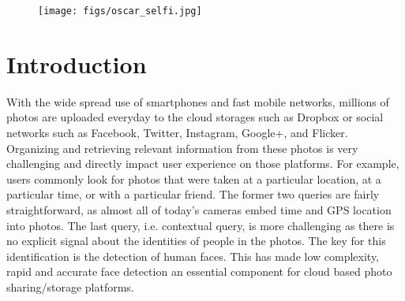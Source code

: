 \documentclass{sig-alternate-2013}
\begin{document}



\begin{figure}[t] 
  \centering
    \texttt{[image: figs/oscar\_selfi.jpg]}
  \caption{}
  \label{fig:challenging_faces}
\end{figure}

\section{Introduction}

With the wide spread use of smartphones and fast mobile networks, millions of photos are uploaded everyday to the cloud storages such as Dropbox or social networks such as Facebook, Twitter, Instagram, Google+, and Flicker. Organizing and retrieving relevant information from these photos is very challenging and directly impact user experience on those platforms. For example, users commonly look for photos that were taken at a particular location, at a particular time, or with a particular friend. The former two queries are fairly straightforward, as almost all of today's cameras embed time and GPS location into photos. The last query, i.e. contextual query, is more challenging as there is no explicit signal about the identities of people in the photos. The key for this identification is the detection of human faces. This has made low complexity, rapid and accurate face detection an essential component for cloud based photo sharing/storage platforms.
\end{document}

